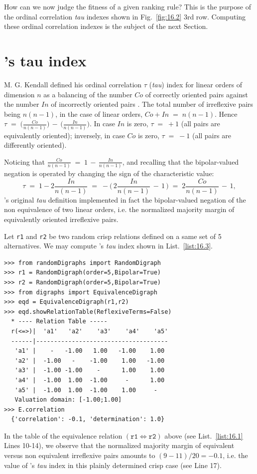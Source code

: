 How can we now judge the fitness of a given ranking rule? This is the purpose of the ordinal correlation \emph{tau} indexes shown in Fig.~\vref{fig:16.2} 3rd row. Computing these ordinal correlation indexes is the subject of the next Section.
 
\section{\Kendall 's tau index}
\label{sec:16:6}


M. G. Kendall defined his ordinal correlation $\tau$ (\emph{tau}) index for linear orders of dimension $n$ as a balancing of the number $Co$ of correctly oriented pairs against the number $In$ of incorrectly oriented pairs \citep{KEN-1938}. The total number of irreflexive pairs being $n(n-1)$, in the case of linear orders, $Co + In \;=\; n(n-1)$.  Hence $\tau \;=\; \big(\frac{Co}{n(n-1)}\big) \,-\, \big(\frac{In}{n(n-1)}\big)$. In case $In$ is zero, $\tau \;=\; +1$  (all pairs are equivalently oriented); inversely, in case $Co$ is zero, $\tau \;=\; -1$ (all pairs are differently oriented).

Noticing that $\frac{Co}{n(n-1)} \;=\; 1 \,-\, \frac{In}{n(n-1)}$, and recalling that the bipolar-valued negation is operated by changing the sign of the characteristic value:
\begin{equation}
      \tau \;=\; 1 -2\frac{In}{n(n-1)} \;=\; -\big(\,2\frac{In}{n(n-1)} \,-\, 1\,\big) \;=\; 2\frac{Co}{n(n-1)} \,-\, 1,
\end{equation} 
\Kendall 's original \emph{tau} definition implemented in fact the bipolar-valued negation of the non equivalence of two linear orders, i.e. the normalized majority margin of equivalently oriented irreflexive pairs.

Let \texttt{r1} and \texttt{r2} be two random crisp relations defined on a same set of 5 alternatives. We may compute \Kendall 's \emph{tau} index shown in List.~\vref{list:16.3}.
\begin{lstlisting}[caption={Computing a relational equivalence digraph},label=list:16.3]
>>> from randomDigraphs import RandomDigraph
>>> r1 = RandomDigraph(order=5,Bipolar=True)
>>> r2 = RandomDigraph(order=5,Bipolar=True)
>>> from digraphs import EquivalenceDigraph
>>> eqd = EquivalenceDigraph(r1,r2)
>>> eqd.showRelationTable(ReflexiveTerms=False)
  * ---- Relation Table -----
  r(<=>)|  'a1'	  'a2'	  'a3'	  'a4'	  'a5'	  
  ------|-------------------------------------
   'a1' |    -   -1.00   1.00   -1.00    1.00	 
   'a2' |  -1.00   -    -1.00    1.00   -1.00	 
   'a3' |  -1.00 -1.00    -      1.00    1.00	 
   'a4' |  -1.00  1.00  -1.00     -      1.00	 
   'a5' |  -1.00  1.00  -1.00    1.00     - 	 
   Valuation domain: [-1.00;1.00]
>>> E.correlation
  {'correlation': -0.1, 'determination': 1.0}
\end{lstlisting}
In the table of the equivalence relation $(\mathtt{r1} \Leftrightarrow \mathtt{r2})$ above (see List.~\vref{list:16.1} Lines 10-14), we observe that the normalized majority margin of equivalent versus non equivalent irreflexive pairs amounts to $(9 - 11)/20 = -0.1$, i.e. the value of \Kendall 's \emph{tau} index in this plainly determined crisp case (see Line 17).

